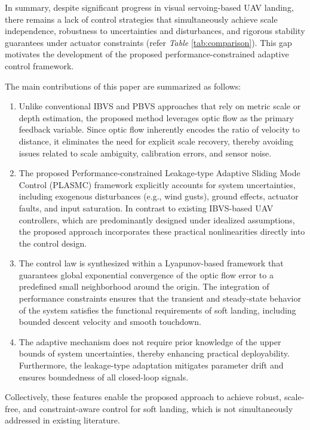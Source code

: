 \documentclass{IEEEtaes}
\begin{document}
In summary, despite significant progress in visual servoing-based UAV landing, there remains a lack of control strategies that simultaneously achieve scale independence, robustness to uncertainties and disturbances, and rigorous stability guarantees under actuator constraints (refer \textit{Table} \ref{tab:comparison}). This gap motivates the development of the proposed performance-constrained adaptive control framework.

The main contributions of this paper are summarized as follows:
\begin{enumerate} 
    \item[(a)] Unlike conventional IBVS and PBVS approaches that rely on metric scale or depth estimation, the proposed method leverages optic flow as the primary feedback variable. Since optic flow inherently encodes the ratio of velocity to distance, it eliminates the need for explicit scale recovery, thereby avoiding issues related to scale ambiguity, calibration errors, and sensor noise.
    \item[(b)] The proposed Performance-constrained Leakage-type Adaptive Sliding Mode Control (PLASMC) framework explicitly accounts for system uncertainties, including exogenous disturbances (e.g., wind gusts), ground effects, actuator faults, and input saturation. In contrast to existing IBVS-based UAV controllers, which are predominantly designed under idealized assumptions, the proposed approach incorporates these practical nonlinearities directly into the control design.
    \item[(c)] The control law is synthesized within a Lyapunov-based framework that guarantees global exponential convergence of the optic flow error to a predefined small neighborhood around the origin. The integration of performance constraints ensures that the transient and steady-state behavior of the system satisfies the functional requirements of soft landing, including bounded descent velocity and smooth touchdown. 
    \item[(d)] The adaptive mechanism does not require prior knowledge of the upper bounds of system uncertainties, thereby enhancing practical deployability. Furthermore, the leakage-type adaptation mitigates parameter drift and ensures boundedness of all closed-loop signals.
\end{enumerate}
Collectively, these features enable the proposed approach to achieve robust, scale-free, and constraint-aware control for soft landing, which is not simultaneously addressed in existing literature.
\end{document}
